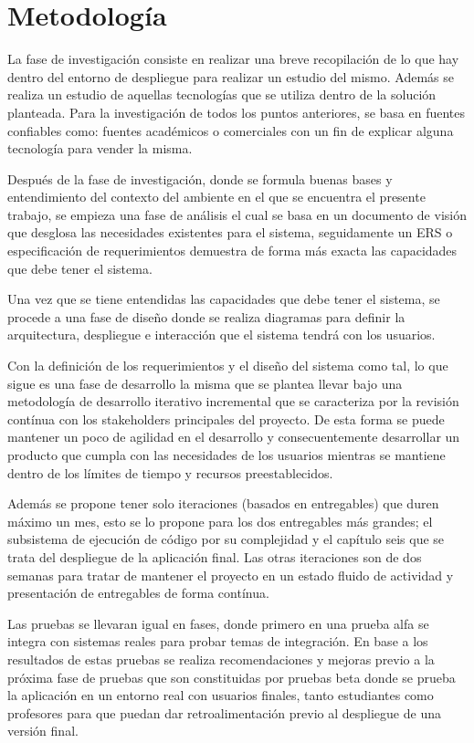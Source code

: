 \section{Metodología}
La fase de investigación consiste en realizar una breve recopilación de lo que hay dentro del entorno de despliegue para realizar un estudio del mismo. Además se realiza un estudio de aquellas tecnologías que se utiliza dentro de la solución planteada. Para la investigación de todos los puntos anteriores, se basa en fuentes confiables como: fuentes académicos o comerciales con un fin de explicar alguna tecnología para vender la misma.

Después de la fase de investigación, donde se formula buenas bases y entendimiento del contexto del ambiente en el que se encuentra el presente trabajo, se empieza una fase de análisis el cual se basa en un documento de visión que desglosa las necesidades existentes para el sistema, seguidamente un ERS o especificación de requerimientos demuestra de forma más exacta las capacidades que debe tener el sistema.
 
Una vez que se tiene entendidas las capacidades que debe tener el sistema, se procede a una fase de diseño donde se realiza diagramas para definir la arquitectura, despliegue e interacción que el sistema tendrá con los usuarios.
 
Con la definición de los requerimientos y el diseño del sistema como tal, lo que sigue es una fase de desarrollo la misma que se plantea llevar bajo una metodología de desarrollo iterativo incremental que se caracteriza por la revisión contínua con los stakeholders principales del proyecto. De esta forma se puede mantener un poco de agilidad en el desarrollo y consecuentemente desarrollar un producto que cumpla con las necesidades de los usuarios mientras se mantiene dentro de los límites de tiempo y recursos preestablecidos.
 
Además se propone tener solo iteraciones (basados en entregables) que duren máximo un mes, esto se lo propone para los dos entregables más grandes; el subsistema de ejecución de código por su complejidad y el capítulo seis que se trata del despliegue de la aplicación final. Las otras iteraciones son de dos semanas para tratar de mantener el proyecto en un estado fluido de actividad y presentación de entregables de forma contínua.
 
Las pruebas se llevaran igual en fases, donde primero en una prueba alfa se integra con sistemas reales para probar temas de integración. En base a los resultados de estas pruebas se realiza recomendaciones y mejoras previo a la próxima fase de pruebas que son constituidas por pruebas beta donde se prueba la aplicación en un entorno real con usuarios finales, tanto estudiantes como profesores para que puedan dar retroalimentación previo al despliegue de una versión final.
 

